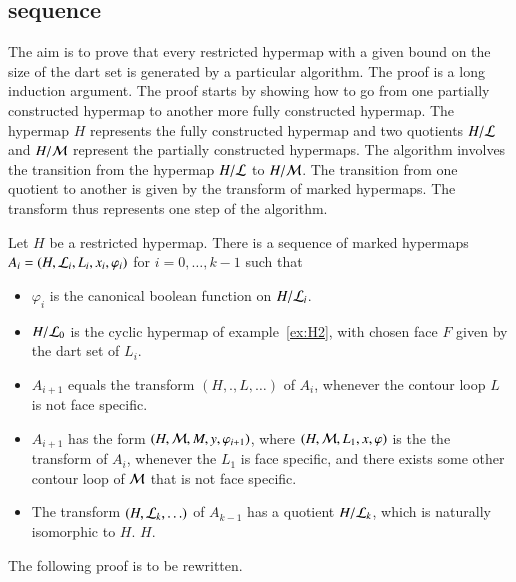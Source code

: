 \subsection{sequence}

The aim is to prove that every restricted hypermap with a given bound
on the size of the dart set is generated by a particular algorithm.
The proof is a long induction argument.  The proof starts by showing
how to go from one partially constructed hypermap to another more
fully constructed hypermap.  The hypermap $H$ represents the fully
constructed hypermap and two quotients $H/{\cal L}$ and $H/{\cal M}$
represent the partially constructed hypermaps.  The algorithm involves
the transition from the hypermap $H/{\cal L}$ to $H/{\cal M}$.  The
transition from one quotient to another is given by the transform of
marked hypermaps.  The transform thus represents one step of the
algorithm.  %

\begin{lemma}  Let $H$ be a restricted hypermap.  
There is a sequence of marked hypermaps
$A_i = (H,{\cal L}_i,L_i,x_i,\varphi_i)$ for $i=0,\ldots,k-1$ such that
\begin{itemize}
\item $\varphi_i$ is the canonical boolean function on $H/{\cal L}_i$.
\item $H/{\cal L}_0$ is the cyclic hypermap of example~\ref{ex:H2}, with
chosen face $F$ given by the dart set of $L_i$.
\item $A_{i+1}$ equals the transform $(H,.,L,\ldots)$ of
$A_i$, whenever the contour loop $L$ is not face specific.
\item $A_{i+1}$ has the form $(H,{\cal M},M,y,\varphi_{i+1})$, where $(H,{\cal M},L_1,x,\varphi)$ is
the the transform of $A_i$, whenever the $L_1$ is face specific, and there exists some other contour loop of ${\cal M}$ that is not face specific.
\item The transform $(H,{\cal L}_k,\ldots)$ of $A_{k-1}$ has a quotient $H/{\cal L}_k$,
which is naturally isomorphic to $H$.  
  $H$.
\end{itemize}
\end{lemma}

\begin{note} %
The following proof is to be rewritten.
\end{note}

